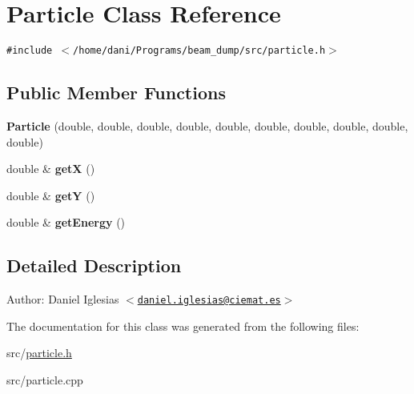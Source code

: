 \hypertarget{classParticle}{
\section{Particle Class Reference}
\label{classParticle}
}
{\tt \#include $<$/home/dani/Programs/beam\_\-dump/src/particle.h$>$}

\subsection*{Public Member Functions}
\begin{CompactItemize}
\item 
\hypertarget{classParticle_601373ac2ae46d32c83fffa45d9a0e6b}{
\textbf{Particle} (double, double, double, double, double, double, double, double, double, double)}
\label{classParticle_601373ac2ae46d32c83fffa45d9a0e6b}

\item 
\hypertarget{classParticle_bf0b2c3e900576254d9e76255dfaf81d}{
double \& \textbf{getX} ()}
\label{classParticle_bf0b2c3e900576254d9e76255dfaf81d}

\item 
\hypertarget{classParticle_0fc4232c919f5b1946c2fa74f7a3a9ed}{
double \& \textbf{getY} ()}
\label{classParticle_0fc4232c919f5b1946c2fa74f7a3a9ed}

\item 
\hypertarget{classParticle_d8d1a1de9b549f2a532a8d9a9f97c8fb}{
double \& \textbf{getEnergy} ()}
\label{classParticle_d8d1a1de9b549f2a532a8d9a9f97c8fb}

\end{CompactItemize}


\subsection{Detailed Description}
\begin{Desc}
\item[Author:]Daniel Iglesias $<$\href{mailto:daniel.iglesias@ciemat.es}{\tt daniel.iglesias@ciemat.es}$>$ \end{Desc}


The documentation for this class was generated from the following files:\begin{CompactItemize}
\item 
src/\hyperlink{particle_8h}{particle.h}\item 
src/particle.cpp\end{CompactItemize}
